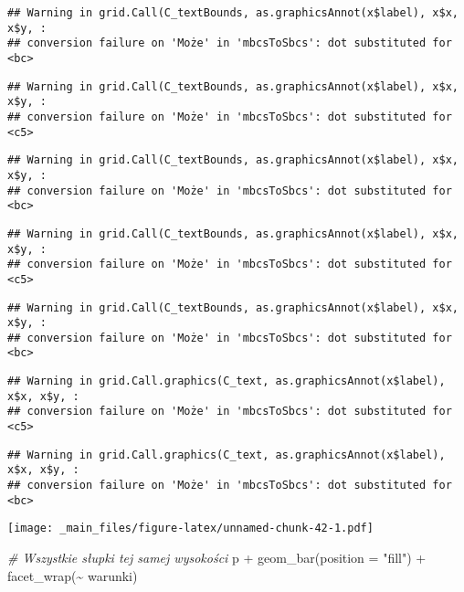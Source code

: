\documentclass[
]{book}
\newenvironment{Shaded}{\begin{snugshade}}{\end{snugshade}}
\newcommand{\AttributeTok}[1]{\textcolor[rgb]{0.77,0.63,0.00}{#1}}
\newcommand{\CommentTok}[1]{\textcolor[rgb]{0.56,0.35,0.01}{\textit{#1}}}
\newcommand{\FunctionTok}[1]{\textcolor[rgb]{0.00,0.00,0.00}{#1}}
\newcommand{\NormalTok}[1]{#1}
\newcommand{\SpecialCharTok}[1]{\textcolor[rgb]{0.00,0.00,0.00}{#1}}
\newcommand{\StringTok}[1]{\textcolor[rgb]{0.31,0.60,0.02}{#1}}
\begin{document}
\begin{verbatim}
## Warning in grid.Call(C_textBounds, as.graphicsAnnot(x$label), x$x, x$y, :
## conversion failure on 'Może' in 'mbcsToSbcs': dot substituted for <bc>
\end{verbatim}

\begin{verbatim}
## Warning in grid.Call(C_textBounds, as.graphicsAnnot(x$label), x$x, x$y, :
## conversion failure on 'Może' in 'mbcsToSbcs': dot substituted for <c5>
\end{verbatim}

\begin{verbatim}
## Warning in grid.Call(C_textBounds, as.graphicsAnnot(x$label), x$x, x$y, :
## conversion failure on 'Może' in 'mbcsToSbcs': dot substituted for <bc>
\end{verbatim}

\begin{verbatim}
## Warning in grid.Call(C_textBounds, as.graphicsAnnot(x$label), x$x, x$y, :
## conversion failure on 'Może' in 'mbcsToSbcs': dot substituted for <c5>
\end{verbatim}

\begin{verbatim}
## Warning in grid.Call(C_textBounds, as.graphicsAnnot(x$label), x$x, x$y, :
## conversion failure on 'Może' in 'mbcsToSbcs': dot substituted for <bc>
\end{verbatim}

\begin{verbatim}
## Warning in grid.Call.graphics(C_text, as.graphicsAnnot(x$label), x$x, x$y, :
## conversion failure on 'Może' in 'mbcsToSbcs': dot substituted for <c5>
\end{verbatim}

\begin{verbatim}
## Warning in grid.Call.graphics(C_text, as.graphicsAnnot(x$label), x$x, x$y, :
## conversion failure on 'Może' in 'mbcsToSbcs': dot substituted for <bc>
\end{verbatim}

\texttt{[image: \_main\_files/figure-latex/unnamed-chunk-42-1.pdf]}

\begin{Shaded}
\begin{Highlighting}[]
\CommentTok{\# Wszystkie słupki tej samej wysokości}
\NormalTok{p }\SpecialCharTok{+} \FunctionTok{geom\_bar}\NormalTok{(}\AttributeTok{position =} \StringTok{"fill"}\NormalTok{) }\SpecialCharTok{+} \FunctionTok{facet\_wrap}\NormalTok{(}\SpecialCharTok{\textasciitilde{}}\NormalTok{ warunki)}
\end{Highlighting}
\end{Shaded}
\end{document}
